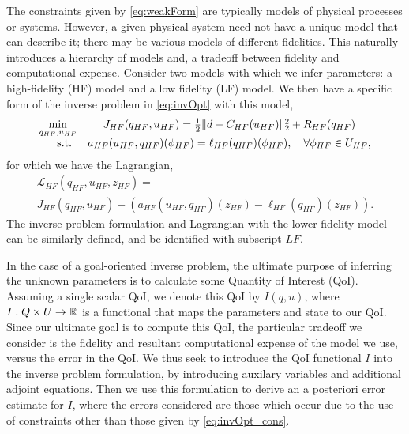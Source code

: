The constraints given by \cref{eq:weakForm} are typically models of physical processes or systems. However, a given physical system need not have a unique model that can describe it; there may be various models of different fidelities. This naturally introduces a hierarchy of models and, a tradeoff between fidelity and computational expense. Consider two models with which we infer parameters: a high-fidelity (HF) model and a low fidelity (LF) model. We then have a specific form of the inverse problem in \cref{eq:invOpt} with this model,
\begin{equation}
\begin{array}{r@{}c}
\min\limits_{q_{HF},u_{HF}} & \quad J_{HF}(q_{HF},u_{HF})=\frac{1}{2}\|d-C_{HF}(u_{HF})\|_2^2 + R_{HF}(q_{HF}) \\ \textrm{s.t. }& \quad a_{HF}(u_{HF},q_{HF})(\phi_{HF})=\ell_{HF}(q_{HF})(\phi_{HF}),\quad\forall\phi_{HF}\in U_{HF},
\end{array}
\end{equation}
for which we have the Lagrangian,
\begin{multline}
\mathcal{L}_{HF}(q_{HF},u_{HF},z_{HF}) = \\
J_{HF}(q_{HF},u_{HF})-(a_{HF}(u_{HF},q_{HF})(z_{HF})-\ell_{HF}(q_{HF})(z_{HF})).
\end{multline}
The inverse problem formulation and Lagrangian with the lower fidelity model can be similarly defined, and be identified with subscript $LF$.

In the case of a goal-oriented inverse problem, the ultimate purpose of inferring the unknown parameters is to calculate some Quantity of Interest (QoI). Assuming a single scalar QoI, we denote this QoI by $I(q,u)$, where $I:Q\times U\to{\mathbb{R}}$ is a functional that maps the parameters and state to our QoI. Since our ultimate goal is to compute this QoI, the particular tradeoff we consider is the fidelity and resultant computational expense of the model we use, versus the error in the QoI. We thus seek to introduce the QoI functional $I$ into the inverse problem formulation, by introducing auxilary variables and additional adjoint equations. Then we use this formulation to derive an a posteriori error estimate for $I$, where the errors considered are those which occur due to the use of constraints other than those given by \cref{eq:invOpt_cons}.
%
